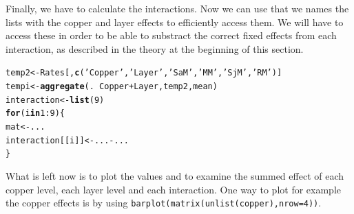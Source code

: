 \documentclass{article}\usepackage[]{graphicx}\usepackage[]{color}
\makeatletter
\newcommand{\hlnum}[1]{\textcolor[rgb]{0.686,0.059,0.569}{#1}}%
\newcommand{\hlstr}[1]{\textcolor[rgb]{0.192,0.494,0.8}{#1}}%
\newcommand{\hlopt}[1]{\textcolor[rgb]{0,0,0}{#1}}%
\newcommand{\hlstd}[1]{\textcolor[rgb]{0.345,0.345,0.345}{#1}}%
\newcommand{\hlkwa}[1]{\textcolor[rgb]{0.161,0.373,0.58}{\textbf{#1}}}%
\newcommand{\hlkwb}[1]{\textcolor[rgb]{0.69,0.353,0.396}{#1}}%
\newcommand{\hlkwd}[1]{\textcolor[rgb]{0.737,0.353,0.396}{\textbf{#1}}}%
\newenvironment{kframe}{%
 \def\at@end@of@kframe{}%
 \ifinner\ifhmode%
  \def\at@end@of@kframe{\end{minipage}}%
  \begin{minipage}{\columnwidth}%
 \fi\fi%
 \def\FrameCommand##1{\hskip\@totalleftmargin \hskip-\fboxsep
 \colorbox{shadecolor}{##1}\hskip-\fboxsep
     \hskip-\linewidth \hskip-\@totalleftmargin \hskip\columnwidth}%
 \MakeFramed {\advance\hsize-\width
   \@totalleftmargin\z@ \linewidth\hsize
   \@setminipage}}%
 {\par\unskip\endMakeFramed%
 \at@end@of@kframe}
\newenvironment{knitrout}{}{} %
\makeatother
\begin{document}
Finally, we have to calculate the interactions. Now we can use that we names the lists with the copper and layer effects to efficiently access them. We will have to access these in order to be able to substract the correct fixed effects from each interaction, as described in the theory at the beginning of this section.
\begin{knitrout}
\color{fgcolor}\begin{kframe}
\begin{alltt}
\hlstd{temp2}  \hlkwb{<-} \hlstd{Rates[,}\hlkwd{c}\hlstd{(}\hlstr{'Copper'}\hlstd{,}\hlstr{'Layer'}\hlstd{,}\hlstr{'SaM'}\hlstd{,}\hlstr{'MM'}\hlstd{,}\hlstr{'SjM'}\hlstd{,}\hlstr{'RM'}\hlstd{)]}
\hlstd{tempi} \hlkwb{<-} \hlkwd{aggregate}\hlstd{(.}\hlopt{~}\hlstd{Copper}\hlopt{+}\hlstd{Layer,temp2,mean)}
\hlstd{interaction} \hlkwb{<-} \hlkwd{list}\hlstd{(}\hlnum{9}\hlstd{)}
\hlkwa{for}\hlstd{(i} \hlkwa{in} \hlnum{1}\hlopt{:}\hlnum{9}\hlstd{)\{}
  \hlstd{mat} \hlkwb{<-} \hlstd{...}
  \hlstd{interaction[[i]]} \hlkwb{<-} \hlstd{...} \hlopt{-} \hlstd{...}
\hlstd{\}}
\end{alltt}
\end{kframe}
\end{knitrout}
What is left now is to plot the values and to examine the summed effect of each copper level, each layer level and each interaction. One way to plot for example the copper effects is by using \texttt{barplot(matrix(unlist(copper),nrow=4))}. 
\end{document}
